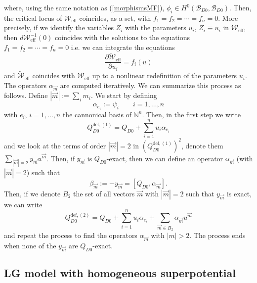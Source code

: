 \documentclass[a4paper,11pt]{article}
\numberwithin{equation}{section}
\begin{document}
where, using the same notation as (\ref{morphismsMF}), $\phi_{i}\in 
H^{0}(\mathcal{B}_{D0},\mathcal{B}_{D0})$. Then, the critical locus of 
$\mathcal{W}_{\mathrm{eff}}$ coincides, as a set, with 
$f_{1}=f_{2}=\cdots=f_{n}=0$. More precisely, if we identify the variables 
$Z_{i}$ with the parameters $u_{i}$, $Z_{i}\equiv u_{i}$ in 
$\mathcal{W}_{\mathrm{eff}}$, then $d\mathcal{W}_{\mathrm{eff}}^{-1}(0)$ 
coincides with the solutions to the equations $f_{1}=f_{2}=\cdots=f_{n}=0$ 
i.e. we can integrate the equations 
\begin{equation}
\frac{\partial \widetilde{\mathcal{W}}_{\mathrm{eff}}}{\partial u_{i}}=f_{i}(u)
\end{equation}
and $\widetilde{\mathcal{W}}_{\mathrm{eff}}$ coincides with 
$\mathcal{W}_{\mathrm{eff}}$ up to a nonlinear redefinition of the parameters 
$u_{i}$. The operators $\alpha_{\vec{m}}$ are computed iteratively. We can 
summarize this process as follows. Define $|\vec{m}|:=\sum_{i}m_{i}$. We start 
by defining
\begin{equation}
\alpha_{e_{i}}:=\psi_{i}\qquad i=1,\ldots,n
\end{equation}
with $e_{i}$, $i=1,\ldots,n$ the cannonical basis of $\mathbb{N}^{n}$. Then, in 
the first step we write
\begin{equation}
Q_{D0}^{\mathrm{def},(1)}=Q_{D0}+\sum_{i=1}^{n}u_{i}\alpha_{e_{i}}
\end{equation}
and we look at the terms of order $|\vec{m}|=2$ in 
$(Q_{D0}^{\mathrm{def},(1)})^{2}$, denote them 
$\sum_{|\vec{m}|=2}y_{\vec{m}}u^{\vec{m}}$. Then, if $y_{\vec{m}}$ is 
$Q_{D0}$-exact, then we can define an operator $\alpha_{\vec{m}}$ (with 
$|\vec{m}|=2$) such that
\begin{equation}
\beta_{\vec{m}}:=-y_{\vec{m}}=[Q_{D0},\alpha_{\vec{m}}].
\end{equation}
Then, if we denote $B_{2}$ the set of all vectors $\vec{m}$ with $|\vec{m}|=2$ 
such that $y_{\vec{m}}$ is exact, we can write 
\begin{equation}
Q_{D0}^{\mathrm{def},(2)}=Q_{D0}+\sum_{i=1}^{n}u_{i}\alpha_{e_{i}}+\sum_{\vec{m}
\in B_{2} }\alpha_{\vec{m}}u^{\vec{m}}
\end{equation}
and repeat the process to find the operators $\alpha_{\vec{m}}$ with $|m|>2$. 
The process ends when none of the $y_{\vec{m}}$ are $Q_{D0}$-exact.


\subsection{LG model with homogeneous superpotential}\label{sec:Af_homo}
\end{document}
